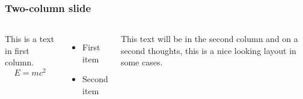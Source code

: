 \documentclass{beamer}
\begin{document}
\begin{frame}
    \frametitle{Two-column slide}
    \begin{columns}
    This is a text in first column.
    $$E=mc^2$$
    \begin{itemize}
    \item First item
    \item Second item
    \end{itemize}
    
    This text will be in the second column
    and on a second thoughts, this is a nice looking
    layout in some cases.
    \end{columns}
\end{frame}
\end{document}
